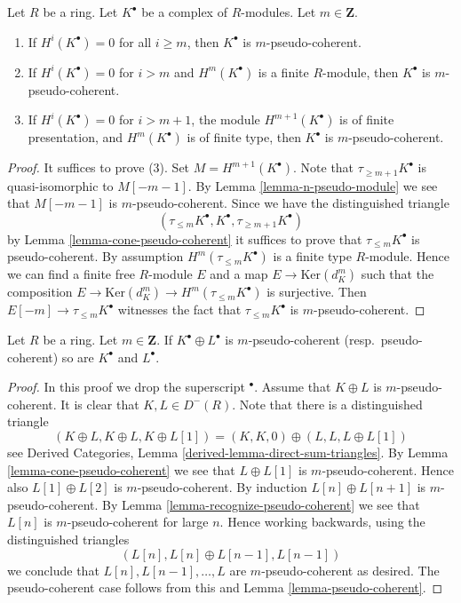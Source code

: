 \begin{lemma}
\label{lemma-recognize-pseudo-coherent}
Let $R$ be a ring. Let $K^\bullet$ be a complex of $R$-modules.
Let $m \in \mathbf{Z}$.
\begin{enumerate}
\item If $H^i(K^\bullet) = 0$ for all $i \geq m$, then
$K^\bullet$ is $m$-pseudo-coherent.
\item If $H^i(K^\bullet) = 0$ for $i > m$ and $H^m(K^\bullet)$ is
a finite $R$-module, then $K^\bullet$ is $m$-pseudo-coherent.
\item If $H^i(K^\bullet) = 0$ for $i > m + 1$, the module
$H^{m + 1}(K^\bullet)$ is of finite presentation, and
$H^m(K^\bullet)$ is of finite type, then $K^\bullet$ is
$m$-pseudo-coherent.
\end{enumerate}
\end{lemma}

\begin{proof}
It suffices to prove (3). Set $M = H^{m + 1}(K^\bullet)$.
Note that $\tau_{\geq m + 1}K^\bullet$ is quasi-isomorphic to
$M[- m - 1]$. By
Lemma \ref{lemma-n-pseudo-module}
we see that $M[- m - 1]$ is $m$-pseudo-coherent. Since we have
the distinguished triangle
$$
(\tau_{\leq m}K^\bullet, K^\bullet, \tau_{\geq m + 1}K^\bullet)
$$
by
Lemma \ref{lemma-cone-pseudo-coherent}
it suffices to prove that $\tau_{\leq m}K^\bullet$ is pseudo-coherent.
By assumption $H^m(\tau_{\leq m}K^\bullet)$ is a finite type $R$-module.
Hence we can find a finite free $R$-module $E$ and a map
$E \to \text{Ker}(d_K^m)$ such that the composition
$E \to \text{Ker}(d_K^m) \to H^m(\tau_{\leq m}K^\bullet)$ is surjective.
Then $E[-m] \to \tau_{\leq m}K^\bullet$ witnesses the fact
that $\tau_{\leq m}K^\bullet$ is $m$-pseudo-coherent.
\end{proof}

\begin{lemma}
\label{lemma-summands-pseudo-coherent}
Let $R$ be a ring. Let $m \in \mathbf{Z}$. If $K^\bullet \oplus L^\bullet$
is $m$-pseudo-coherent (resp.\ pseudo-coherent)
so are $K^\bullet$ and $L^\bullet$.
\end{lemma}

\begin{proof}
In this proof we drop the superscript ${}^\bullet$.
Assume that $K \oplus L$ is $m$-pseudo-coherent.
It is clear that $K, L \in D^{-}(R)$.
Note that there is a distinguished triangle
$$
(K \oplus L, K \oplus L, K \oplus L[1]) =
(K, K, 0) \oplus (L, L, L \oplus L[1])
$$
see
Derived Categories, Lemma \ref{derived-lemma-direct-sum-triangles}.
By
Lemma \ref{lemma-cone-pseudo-coherent}
we see that $L \oplus L[1]$ is $m$-pseudo-coherent.
Hence also $L[1] \oplus L[2]$ is $m$-pseudo-coherent.
By induction $L[n] \oplus L[n + 1]$ is $m$-pseudo-coherent.
By
Lemma \ref{lemma-recognize-pseudo-coherent}
we see that $L[n]$ is $m$-pseudo-coherent for large $n$.
Hence working backwards, using the distinguished triangles
$$
(L[n], L[n] \oplus L[n - 1], L[n - 1])
$$
we conclude that $L[n], L[n - 1], \ldots, L$ are $m$-pseudo-coherent
as desired. The pseudo-coherent case follows from this and
Lemma \ref{lemma-pseudo-coherent}.
\end{proof}

